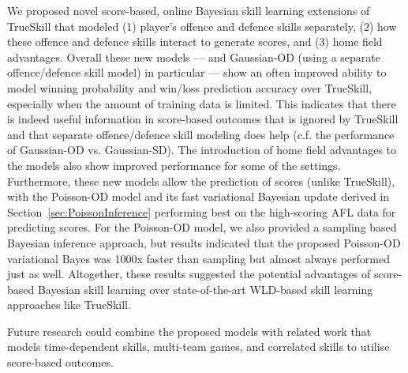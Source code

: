 We proposed novel score-based, online Bayesian skill learning extensions of
TrueSkill that modeled (1) player's offence and defence skills
separately, (2) how these offence and defence skills
interact to generate scores, and (3) home field advantages.  Overall these new models --- and
Gaussian-OD (using a separate offence/defence skill model) in particular ---
show an often improved ability to model winning probability and
win/loss prediction accuracy over TrueSkill, especially when the
amount of training data is limited. This indicates that there is
indeed useful information in score-based outcomes that is ignored by
TrueSkill and that separate offence/defence skill modeling does help
(c.f. the performance of Gaussian-OD vs. Gaussian-SD). The introduction of home field advantages to the models also show improved performance for some of the settings. Furthermore, these new models allow the prediction of scores (unlike TrueSkill),
with the Poisson-OD model and its fast variational Bayesian update derived
in Section~\ref{sec:PoissonInference} performing best on the
high-scoring AFL data for predicting scores. For the Poisson-OD model, we also provided a sampling based Bayesian inference approach, but results indicated that the proposed Poisson-OD variational Bayes was 1000x faster than sampling but almost always performed just as well. Altogether, these results suggested the
potential advantages of score-based Bayesian skill learning over
state-of-the-art WLD-based skill learning approaches like TrueSkill.

Future research could combine the proposed models with related work that models time-dependent skills, multi-team games, and correlated skills to utilise score-based outcomes.